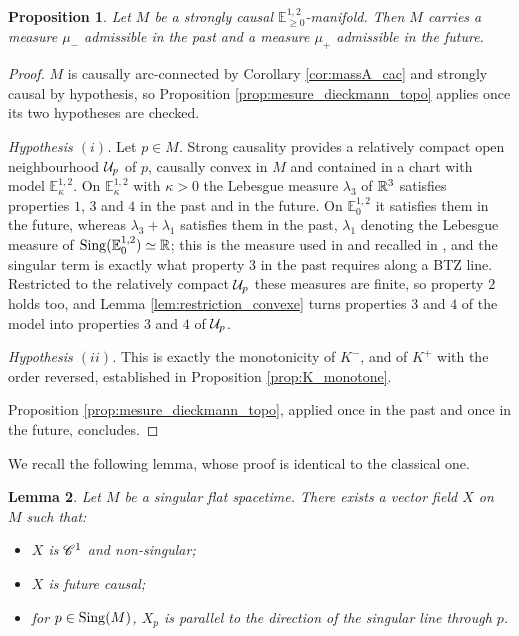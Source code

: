 \documentclass[a4paper,twoside]{article}
\newcommand{\mass}[1]{\mathbb{E}^{1,2}_{#1}}
\newtheorem{lem}{Lemma}[section]
\newtheorem{prop}[lem]{Proposition}
\begin{document}
\begin{prop}\label{prop:mesure_admissible} Let $M$ be a strongly causal $\mass{\geq 0}$-manifold.
Then $M$ carries a measure $\mu_-$ admissible in the past and a measure $\mu_+$ admissible in the future.
\end{prop}
\begin{proof}
$M$ is causally arc-connected by Corollary \ref{cor:massA_cac} and strongly causal by hypothesis, so
Proposition \ref{prop:mesure_dieckmann_topo} applies once its two hypotheses are checked.

\emph{Hypothesis $(i)$.} Let $p\in M$. Strong causality provides a relatively compact open
neighbourhood $\mathcal{U}_p$ of $p$, causally convex in $M$ and contained in a chart with model
$\mass{\kappa}$. On $\mass{\kappa}$ with $\kappa>0$ the Lebesgue measure $\lambda_3$ of $\mathbb R^3$
satisfies properties $1$, $3$ and $4$ in the past and in the future. On $\mass{0}$ it satisfies them
in the future, whereas $\lambda_3+\lambda_1$ satisfies them in the past, $\lambda_1$ denoting the
Lebesgue measure of $\sing(\mass{0})\simeq\RR$; this is the measure used in \cite{thesis} and
recalled in \cite[Section~1.2]{brunswic2021cauchy}, and the singular term is exactly what property
$3$ in the past requires along a BTZ line. Restricted to the relatively compact $\mathcal{U}_p$ these measures
are finite, so property $2$ holds too, and Lemma \ref{lem:restriction_convexe} turns properties $3$
and $4$ of the model into properties $3$ and $4$ of $\mathcal{U}_p$.

\emph{Hypothesis $(ii)$.} This is exactly the monotonicity of $K^-$, and of $K^+$ with the order
reversed, established in Proposition \ref{prop:K_monotone}.

Proposition \ref{prop:mesure_dieckmann_topo}, applied once in the past and once in the future, concludes.
\end{proof}
We recall the following lemma, whose proof is identical to the classical one.
\begin{lem}\label{lem:vecteur} Let $M$ be a singular flat spacetime. There exists a vector field $X$
on $M$ such that:
\begin{itemize}
\item $X$ is $\mathscr C^1$ and non-singular;
\item $X$ is future causal;
\item for $p\in \mathrm{Sing}(M)$, $X_p$ is parallel to the direction of the singular line through $p$.
\end{itemize}
\end{lem}
\end{document}
